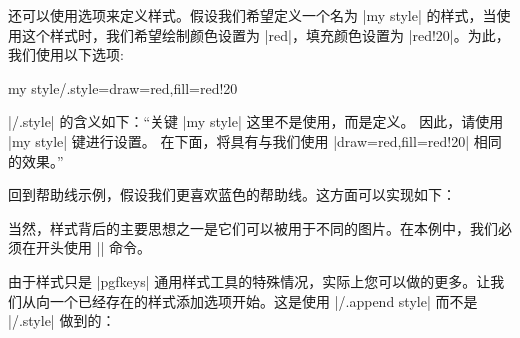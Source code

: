 还可以使用选项来定义样式。假设我们希望定义一个名为 |my style| 的样式，当使用这个样式时，我们希望绘制颜色设置为 |red|，填充颜色设置为 |red!20|。为此，我们使用以下选项:
%
\begin{codeexample}
my style/.style={draw=red,fill=red!20}
\end{codeexample}


|/.style| 的含义如下：``关键 |my style| 这里不是使用，而是定义。 因此，请使用 |my style| 键进行设置。 在下面，将具有与我们使用 |draw=red,fill=red!20| 相同的效果。''


回到帮助线示例，假设我们更喜欢蓝色的帮助线。这方面可以实现如下：
%
\begin{codeexample}[]
\end{codeexample}


当然，样式背后的主要思想之一是它们可以被用于不同的图片。在本例中，我们必须在开头使用 |\tikzset| 命令。
%
\begin{codeexample}[]
\end{codeexample}


由于样式只是 |pgfkeys| 通用样式工具的特殊情况，实际上您可以做的更多。让我们从向一个已经存在的样式添加选项开始。这是使用 |/.append style| 而不是 |/.style| 做到的：
%
\begin{codeexample}[]
\end{codeexample}
%


